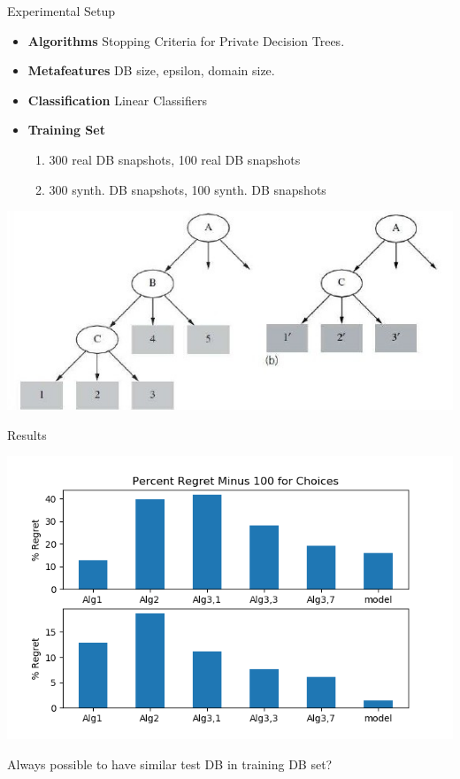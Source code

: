 \documentclass{beamer}
\begin{document}
\begin{frame}{Experimental Setup}
\begin{itemize}
\item \textbf{Algorithms} Stopping Criteria for Private Decision Trees.
\item \textbf{Metafeatures} DB size, epsilon, domain size.
\item \textbf{Classification} Linear Classifiers
\item \textbf{Training Set} 
\begin{enumerate}
\item 300 real DB snapshots, 100 real DB snapshots
\item 300 synth. DB snapshots, 100 synth. DB snapshots
\end{enumerate}
\end{itemize}
\begin{center}
\includegraphics[scale=0.35]{DTreeStopping}
\end{center}
\end{frame}

\begin{frame}{Results}
\begin{center}
\includegraphics[scale=0.6]{Results}
\end{center}
Always possible to have similar test DB in training DB set?
\end{frame}
\end{document}
